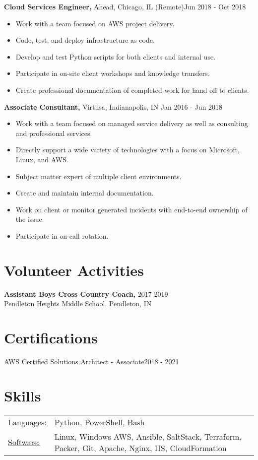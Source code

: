 \documentclass[margin]{res}
\begin{document}
\begin{resume}
 
 
{\bf Cloud Services Engineer,} Ahead, Chicago, IL (Remote)\hfill Jun 2018 - Oct 2018 
\begin{itemize} \itemsep -2pt %
\item Work with a team focused on AWS project delivery.
\item Code, test, and deploy infrastructure as code.
\item Develop and test Python scripts for both clients and internal use.
\item Participate in on-site client workshops and knowledge transfers.
\item Create professional documentation of completed work for hand off to clients.
\end{itemize}

{\bf Associate Consultant,} Virtusa, Indianapolis, IN \hfill Jan 2016 - Jun 2018               
\begin{itemize} \itemsep -2pt
\item  Work with a team focused on managed service delivery as well as consulting and professional services.
\item Directly support a wide variety of technologies with a focus on Microsoft, Linux, and AWS.
\item Subject matter expert of multiple client environments.
\item Create and maintain internal documentation.
\item Work on client or monitor generated incidents with end-to-end ownership of the issue.
\item Participate in on-call rotation.
\end{itemize}

\section{Volunteer Activities} 
               {\bf Assistant Boys Cross Country Coach,} \hfill2017-2019\\
               Pendleton Heights Middle School, Pendleton, IN

\section{Certifications} 
AWS Certified Solutions Architect - Associate\hfill 2018 - 2021
 

\section{Skills}
   \begin{tabular}{l p{3in}}
    \underline{Languages:} & Python, PowerShell, Bash \\

     \underline{Software:} & Linux, Windows AWS, Ansible, SaltStack, Terraform, Packer,
                            Git, Apache, Nginx, IIS, CloudFormation 
 \end{tabular}

\end{resume} 
\end{document}
